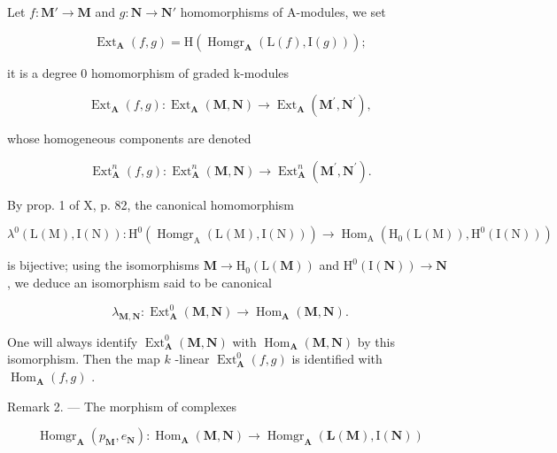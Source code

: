 Let \(f: \mathbf{M}' \to \mathbf{M}\) and \(g: \mathbf{N} \to \mathbf{N}'\) homomorphisms of A-modules, we set

\[
\operatorname{Ext} _ {\mathbf {A}} (f, g) = \mathrm{H} \left(\operatorname{Homgr} _ {\mathbf {A}} (\mathrm{L} (f), \mathrm{I} (g))\right);
\]

it is a degree 0 homomorphism of graded k-modules

\[
\operatorname{Ext} _ {\mathbf {A}} (f, g): \operatorname{Ext} _ {\mathbf {A}} (\mathbf {M}, \mathbf {N}) \rightarrow \operatorname{Ext} _ {\mathbf {A}} \left(\mathbf {M} ^ {\prime}, \mathbf {N} ^ {\prime}\right),
\]

whose homogeneous components are denoted

\[
\operatorname{Ext} _ {\mathbf {A}} ^ {n} (f, g): \operatorname{Ext} _ {\mathbf {A}} ^ {n} (\mathbf {M}, \mathbf {N}) \rightarrow \operatorname{Ext} _ {\mathbf {A}} ^ {n} \left(\mathbf {M} ^ {\prime}, \mathbf {N} ^ {\prime}\right).
\]

By prop. 1 of X, p. 82, the canonical homomorphism

\[
\lambda^ {0} (\mathrm{L} (\mathrm{M}), \mathrm{I} (\mathrm{N})): \mathrm{H} ^ {0} \left(\operatorname{Homgr} _ {\mathrm{A}} (\mathrm{L} (\mathrm{M}), \mathrm{I} (\mathrm{N}))\right)\rightarrow \operatorname{Hom} _ {\mathrm{A}} \left(\mathrm{H} _ {0} (\mathrm{L} (\mathrm{M})), \mathrm{H} ^ {0} (\mathrm{I} (\mathrm{N}))\right)
\]

is bijective; using the isomorphisms \(\mathbf{M} \to \mathrm{H}_{0}(\mathrm{L}(\mathbf{M}))\) and \(\mathrm{H}^{0}(\mathrm{I}(\mathbf{N})) \to \mathbf{N}\) , we deduce an isomorphism said to be canonical

\[
\lambda_ {\mathbf {M}, \mathbf {N}}: \operatorname{Ext} _ {\mathbf {A}} ^ {0} (\mathbf {M}, \mathbf {N}) \rightarrow \operatorname{Hom} _ {\mathbf {A}} (\mathbf {M}, \mathbf {N}).\tag{7}
\]

One will always identify \(\operatorname{Ext}_{\mathbf{A}}^{0}(\mathbf{M},\mathbf{N})\) with \(\operatorname{Hom}_{\mathbf{A}}(\mathbf{M},\mathbf{N})\) by this isomorphism. Then the map \(k\) -linear \(\operatorname{Ext}_{\mathbf{A}}^{0}(f,g)\) is identified with \(\operatorname{Hom}_{\mathbf{A}}(f,g)\) .

Remark 2. --- The morphism of complexes

\[
\operatorname{Homgr} _ {\mathbf {A}} \left(p _ {\mathbf {M}}, e _ {\mathbf {N}}\right): \operatorname{Hom} _ {\mathbf {A}} (\mathbf {M}, \mathbf {N}) \rightarrow \operatorname{Homgr} _ {\mathbf {A}} \left(\mathbf {L} (\mathbf {M}), \mathrm{I} (\mathbf {N})\right)
\]

